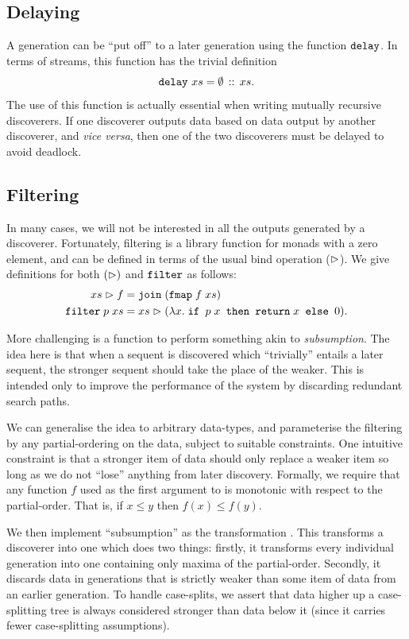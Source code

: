 \subsection{Delaying}
A generation can be ``put off'' to a later generation using the function $\texttt{delay}$. In terms of streams, this function has the trivial definition
\begin{displaymath}
  \texttt{delay}\ xs = \emptyset\,::\,xs.
\end{displaymath}
The use of this function is actually essential when writing mutually recursive discoverers. If one discoverer outputs data based on data output by another discoverer, and \emph{vice versa}, then one of the two discoverers must be delayed to avoid deadlock.

\subsection{Filtering}\label{sec:Filtering}
In many cases, we will not be interested in all the outputs generated by a discoverer. Fortunately, filtering is a library function for monads with a zero element, and can be defined in terms of the usual bind operation ($\vartriangleright$). We give definitions for both $(\vartriangleright)$ and $\texttt{filter}$ as follows:
\begin{align*}
xs \vartriangleright f &= \texttt{join}\;(\texttt{fmap}\;f\;xs) \\
\texttt{filter}\;p\;xs &= xs \vartriangleright (\lambda x.\;\texttt{if } p\;x \texttt{ then } \texttt{return}\;x \texttt { else } 0).
\end{align*}

More challenging is a function to perform something akin to \emph{subsumption}. The idea here is that when a sequent is discovered which ``trivially'' entails a later sequent, the stronger sequent should take the place of the weaker. This is intended only to improve the performance of the system by discarding redundant search paths. 

We can generalise the idea to arbitrary data-types, and parameterise the filtering by any partial-ordering on the data, subject to suitable constraints. One intuitive constraint is that a stronger item of data should only replace a weaker item so long as we do not ``lose'' anything from later discovery. Formally, we require that any function $f$ used as the first argument to  is monotonic with respect to the partial-order. That is, if $x \leq y$ then $f(x) \leq f(y)$. 

We then implement ``subsumption'' as the transformation . This transforms a discoverer into one which does two things: firstly, it transforms every individual generation into one containing only maxima of the partial-order. Secondly, it discards data in generations that is strictly weaker than some item of data from an earlier generation. To handle case-splits, we assert that data higher up a case-splitting tree is always considered stronger than data below it (since it carries fewer case-splitting assumptions).

